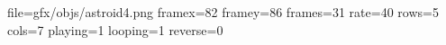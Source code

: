 file=gfx/objs/astroid4.png
framex=82
framey=86
frames=31
rate=40
rows=5
cols=7
playing=1
looping=1
reverse=0